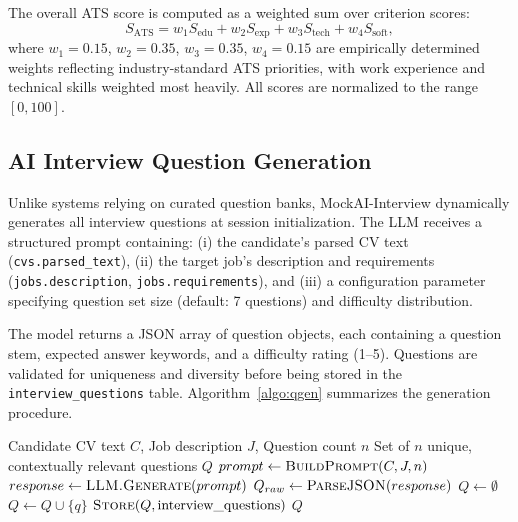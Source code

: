 \documentclass[pdflatex,sn-mathphys-num]{sn-jnl}%
\theoremstyle{thmstyleone}%
\theoremstyle{thmstyletwo}%
\theoremstyle{thmstylethree}%
\begin{document}
The overall ATS score is computed as a weighted sum over criterion scores:
\begin{equation}
S_{\text{ATS}} = w_1 S_{\text{edu}} + w_2 S_{\text{exp}} + w_3 S_{\text{tech}} + w_4 S_{\text{soft}},\label{eq:ats}
\end{equation}
where $w_1 = 0.15$, $w_2 = 0.35$, $w_3 = 0.35$, $w_4 = 0.15$ are empirically determined weights reflecting industry-standard ATS priorities, with work experience and technical skills weighted most heavily. All scores are normalized to the range $[0, 100]$.

\subsection{AI Interview Question Generation}\label{subsec4-4}

Unlike systems relying on curated question banks, MockAI-Interview dynamically generates all interview questions at session initialization. The LLM receives a structured prompt containing: (i) the candidate's parsed CV text (\texttt{cvs.parsed\_text}), (ii) the target job's description and requirements (\texttt{jobs.description}, \texttt{jobs.requirements}), and (iii) a configuration parameter specifying question set size (default: 7 questions) and difficulty distribution.

The model returns a JSON array of question objects, each containing a question stem, expected answer keywords, and a difficulty rating (1--5). Questions are validated for uniqueness and diversity before being stored in the \texttt{interview\_questions} table. Algorithm~\ref{algo:qgen} summarizes the generation procedure.

\begin{algorithm}
\caption{LLM-based Adaptive Interview Question Generation}\label{algo:qgen}
\begin{algorithmic}[1]
\Require Candidate CV text $C$, Job description $J$, Question count $n$
\Ensure Set of $n$ unique, contextually relevant questions $Q$
\State $prompt \leftarrow \textsc{BuildPrompt}(C, J, n)$
\State $response \leftarrow \textsc{LLM.Generate}(prompt)$
\State $Q_{raw} \leftarrow \textsc{ParseJSON}(response)$
\State $Q \leftarrow \emptyset$
    \State $Q \leftarrow Q \cup \{q\}$
  \EndIf
\EndFor
\State $\textsc{Store}(Q, \text{interview\_questions})$
\State \Return $Q$
\end{algorithmic}
\end{algorithm}
\end{document}
